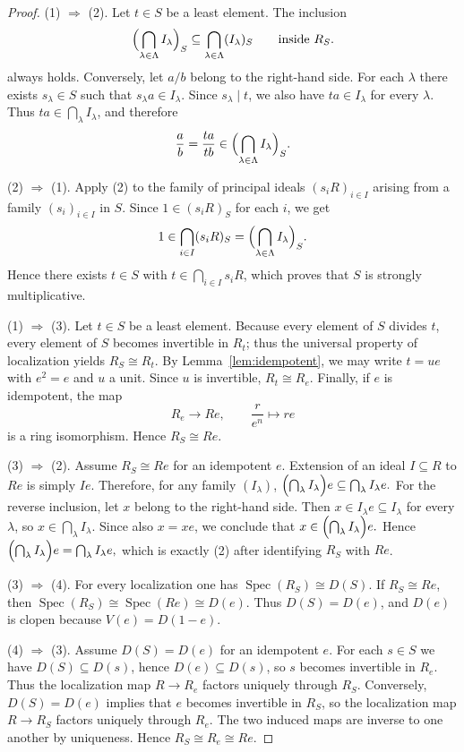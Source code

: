 \documentclass[11pt]{amsart}
\theoremstyle{definition}
\theoremstyle{remark}
\newcommand{\Spec}{\operatorname{Spec}}
\begin{document}
\begin{proof}
(1) $\Rightarrow$ (2).
Let $t \in S$ be a least element.
The inclusion
\[
\Bigl(\bigcap_{\lambda \in \Lambda} I_\lambda\Bigr)_S
\subseteq
\bigcap_{\lambda \in \Lambda} (I_\lambda)_S
\qquad\text{inside } R_S.
\]
always holds.
Conversely, let $a/b$ belong to the right-hand side.
For each $\lambda$ there exists $s_\lambda \in S$ such that $s_\lambda a \in I_\lambda$.
Since $s_\lambda \mid t$, we also have $ta \in I_\lambda$ for every $\lambda$.
Thus $ta \in \bigcap_\lambda I_\lambda$, and therefore
\[
\frac{a}{b}=\frac{ta}{tb}\in
\Bigl(\bigcap_{\lambda \in \Lambda} I_\lambda\Bigr)_S.
\]

(2) $\Rightarrow$ (1).
Apply (2) to the family of principal ideals $(s_iR)_{i \in I}$ arising from a family $(s_i)_{i \in I}$ in $S$.
Since $1 \in (s_iR)_S$ for each $i$, we get
\[
1 \in \bigcap_{i \in I} (s_iR)_S=\Bigl(\bigcap_{\lambda \in \Lambda} I_\lambda\Bigr)_S.
\]
Hence there exists $t \in S$ with $t \in \bigcap_{i \in I} s_iR$, which proves that $S$ is strongly multiplicative.

(1) $\Rightarrow$ (3).
Let $t \in S$ be a least element.
Because every element of $S$ divides $t$, every element of $S$ becomes invertible in $R_t$; thus the universal property of localization yields $R_S \cong R_t$.
By Lemma~\ref{lem:idempotent}, we may write $t=ue$ with $e^2=e$ and $u$ a unit.
Since $u$ is invertible, $R_t \cong R_e$.
Finally, if $e$ is idempotent, the map
\[
R_e \longrightarrow Re,\qquad \frac{r}{e^n}\longmapsto re
\]
is a ring isomorphism.
Hence $R_S \cong Re$.

(3) $\Rightarrow$ (2).
Assume $R_S \cong Re$ for an idempotent $e$.
Extension of an ideal $I \subseteq R$ to $Re$ is simply $Ie$.
Therefore, for any family $(I_\lambda)$,
$\Bigl(\bigcap_{\lambda} I_\lambda\Bigr)e
\subseteq
\bigcap_{\lambda} I_\lambda e.$
For the reverse inclusion, let $x$ belong to the right-hand side.
Then $x \in I_\lambda e \subseteq I_\lambda$ for every $\lambda$, so $x \in \bigcap_\lambda I_\lambda$.
Since also $x=xe$, we conclude that
$x \in \Bigl(\bigcap_{\lambda} I_\lambda\Bigr)e.$
Hence
$\Bigl(\bigcap_{\lambda} I_\lambda\Bigr)e
=
\bigcap_{\lambda} I_\lambda e,$
which is exactly (2) after identifying $R_S$ with $Re$.

(3) $\Rightarrow$ (4).
For every localization one has $\Spec(R_S)\cong D(S)$.
If $R_S \cong Re$, then $\Spec(R_S)\cong \Spec(Re)\cong D(e)$.
Thus $D(S)=D(e)$, and $D(e)$ is clopen because $V(e)=D(1-e)$.

(4) $\Rightarrow$ (3).
Assume $D(S)=D(e)$ for an idempotent $e$.
For each $s \in S$ we have $D(S)\subseteq D(s)$, hence $D(e)\subseteq D(s)$, so $s$ becomes invertible in $R_e$.
Thus the localization map $R \to R_e$ factors uniquely through $R_S$.
Conversely, $D(S)=D(e)$ implies that $e$ becomes invertible in $R_S$, so the localization map $R \to R_S$ factors uniquely through $R_e$.
The two induced maps are inverse to one another by uniqueness.
Hence $R_S \cong R_e \cong Re$.
\end{proof}
\end{document}
